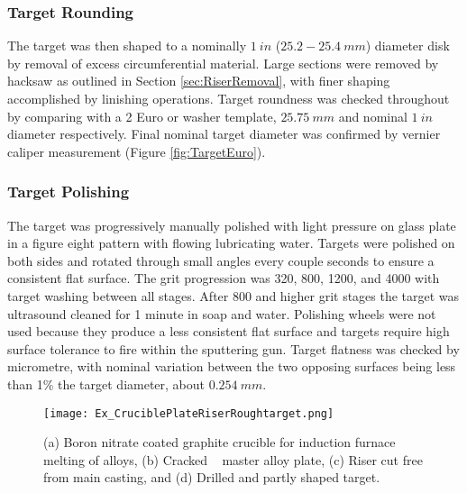 \documentclass[a4paper,12pt,oneside]{report}%
\begin{document}
\subsubsection{Target Rounding}
The target was then shaped to a nominally $1~ in$ ($25.2 - 25.4~ mm$) diameter disk by removal of excess circumferential material. Large sections were removed by hacksaw as outlined in Section \ref{sec:RiserRemoval}, with finer shaping accomplished by linishing operations. Target roundness was checked throughout by comparing with a 2 Euro or washer template, $25.75~ mm$ and nominal $1~ in$ diameter respectively. Final nominal target diameter was confirmed by vernier caliper measurement (Figure \ref{fig:TargetEuro}).  

\subsubsection{Target Polishing}
The target was progressively manually polished with light pressure on glass plate in a figure eight pattern with flowing lubricating water. Targets were polished on both sides and rotated through small angles every couple seconds to ensure a consistent flat surface. The grit progression was 320, 800, 1200, and 4000 with target washing between all stages. After 800 and higher grit stages the target was ultrasound cleaned for 1 minute in soap and water. Polishing wheels were not used because they produce a less consistent flat surface and targets require high surface tolerance to fire within the sputtering gun. Target flatness was checked by micrometre, with nominal variation between the two opposing surfaces being less than 1\% the target diameter, about $0.254~ mm$. 

\begin{figure}[htbp]
	\centering
	\texttt{[image: Ex\_CruciblePlateRiserRoughtarget.png]}
	\caption{(a) Boron nitrate coated graphite crucible for induction furnace melting of alloys, (b) Cracked \MgZnCa~ master alloy plate, (c) Riser cut free from main casting, and (d) Drilled and partly shaped target.}
	\label{fig:CrucibleShaping}
\end{figure}
\end{document}
